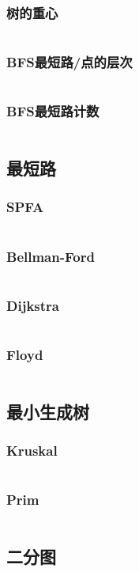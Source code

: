 \documentclass[a4paper,12pt]{article}
\begin{document}
\subsubsection{树的重心}
\inputminted[breaklines]{c++}{graph/bdfs/grav.cc}
\subsubsection{BFS最短路/点的层次}
\inputminted[breaklines]{c++}{graph/bdfs/cenci.cc}
\subsubsection{BFS最短路计数}
\inputminted[breaklines]{c++}{graph/bdfs/sum.cc}
\subsection{最短路} %
\subsubsection{SPFA}
\inputminted[breaklines]{c++}{graph/shortest_path/spfa.cc}
\subsubsection{Bellman-Ford}
\inputminted[breaklines]{c++}{graph/shortest_path/bellman.cc}
\subsubsection{Dijkstra}
\inputminted[breaklines]{c++}{graph/shortest_path/dij.cc}
\subsubsection{Floyd}
\inputminted[breaklines]{c++}{graph/shortest_path/floyd.cc}
\subsection{最小生成树} %
\subsubsection{Kruskal} 
\inputminted[breaklines]{c++}{graph/mst/kruskal.cc}
\subsubsection{Prim} 
\inputminted[breaklines]{c++}{graph/mst/prim.cc}
\subsection{二分图} %
\end{document}
